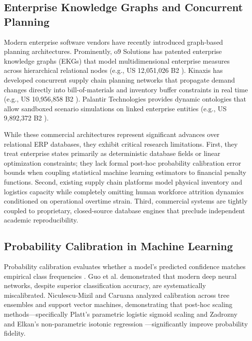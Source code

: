\documentclass[journal]{IEEEtran}
\begin{document}
\subsection{Enterprise Knowledge Graphs and Concurrent Planning}
Modern enterprise software vendors have recently introduced graph-based planning architectures. Prominently, o9 Solutions has patented enterprise knowledge graphs (EKGs) that model multidimensional enterprise measures across hierarchical relational nodes (e.g., US 12,051,026 B2 \cite{verma2024computational}). Kinaxis has developed concurrent supply chain planning networks that propagate demand changes directly into bill-of-materials and inventory buffer constraints in real time (e.g., US 10,956,858 B2 \cite{dent2021cognitive}). Palantir Technologies provides dynamic ontologies that allow sandboxed scenario simulations on linked enterprise entities (e.g., US 9,892,372 B2 \cite{karp2018creating}).

While these commercial architectures represent significant advances over relational ERP databases, they exhibit critical research limitations. First, they treat enterprise states primarily as deterministic database fields or linear optimization constraints; they lack formal post-hoc probability calibration error bounds when coupling statistical machine learning estimators to financial penalty functions. Second, existing supply chain platforms model physical inventory and logistics capacity while completely omitting human workforce attrition dynamics conditioned on operational overtime strain. Third, commercial systems are tightly coupled to proprietary, closed-source database engines that preclude independent academic reproducibility.

\subsection{Probability Calibration in Machine Learning}
Probability calibration evaluates whether a model's predicted confidence matches empirical class frequencies \cite{dawid1982well}. Guo et al. \cite{guo2017calibration} demonstrated that modern deep neural networks, despite superior classification accuracy, are systematically miscalibrated. Niculescu-Mizil and Caruana \cite{niculescu2005predicting} analyzed calibration across tree ensembles and support vector machines, demonstrating that post-hoc scaling methods---specifically Platt's parametric logistic sigmoid scaling \cite{platt1999probabilistic} and Zadrozny and Elkan's non-parametric isotonic regression \cite{zadrozny2002transforming}---significantly improve probability fidelity.
\end{document}
